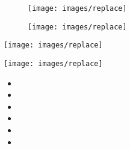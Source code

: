 \begin{figure}[!h]
    \centering
    \begin{minipage}[b]{.4\linewidth} %
        \texttt{[image: images/replace]}
        \label{fig:replace}
    \end{minipage}
    \hspace{.1\linewidth}%
    \begin{minipage}[b]{.4\linewidth} %
        \texttt{[image: images/replace]}
        \label{fig:replace}
    \end{minipage}
\end{figure}


\begin{center}
    \texttt{[image: images/replace]}
    \label{fig:replace}
\end{center}

\begin{center}
    \texttt{[image: images/replace]}
    \label{fig:replace}
\end{center}


\begin{itemize}
    \item
    \item
    \item
    \item
    \item
    \item
\end{itemize}


